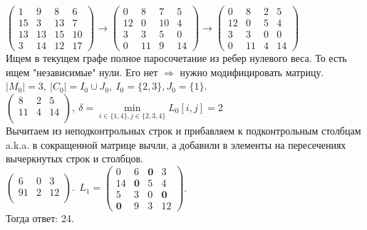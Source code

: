 	\begin{Example}
		$\left( 
		\begin{array}{cccc}
			1 & 9 & 8 & 6\\
			15 & 3 & 13 & 7\\
			13 & 13 & 15 & 10\\
			3 & 14 & 12 & 17
		\end{array}
		\right) \to
		\left( 
		\begin{array}{cccc}
			0 & 8 & 7 & 5\\
			12 & 0 & 10 & 4\\
			3 & 3 & 5 & 0\\
			0 & 11 & 9 & 14
		\end{array}
		\right) \to
		\left( 
		\begin{array}{cccc}
			0 & 8 & 2 & 5\\
			12 & 0 & 5 & 4\\
			3 & 3 & 0 & 0\\
			0 & 11 & 4 & 14
		\end{array}
		\right)
		$\\
		Ищем в текущем графе полное паросочетание из ребер нулевого веса. То есть ищем 
		"независимые" нули. Его нет $\Rightarrow$ нужно модифицировать матрицу.
		$|M_0| = 3, \ |C_0| = I_0 \cup J_0, \ I_0 = \{2, 3\}, J_0 = \{1\}$.\\
		$\left( 
			\begin{array}{cccc}
				8 & 2 & 5\\
				11 & 4 & 14\\
			\end{array}
		\right), \ \delta = \underset{i \in \{1, 4\}, j \in \{2, 3, 4\}}{\min} L_0[i,j] = 2$\\
		Вычитаем из неподконтрольных строк и прибавляем к подконтрольным столбцам a.k.a. в сокращенной
		матрице вычли, а добавили в элементы на пересечениях вычеркнутых строк и столбцов.\\

		$\left( 
			\begin{array}{cccc}
				6 & 0 & 3\\
				91 & 2 & 12\\
			\end{array}
		\right). \ \ L_1 = 
		\left( 
		\begin{array}{cccc}
			0 & 6 & \textbf{0}  & 3\\
			14 & \textbf{0}  & 5 & 4\\
			5 & 3 & 0 & \textbf{0} \\
			\textbf{0}  & 9 & 3 & 12
		\end{array}
		\right)$.\\ 
		Тогда ответ: 24. 
	\end{Example}

